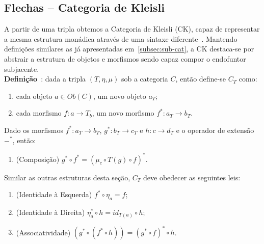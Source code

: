 \documentclass[10pt, conference]{IEEEtran}
\begin{document}
\subsection{Flechas -- Categoria de Kleisli}
\label{subsec:arrow}
A partir de uma tripla obtemos a Categoria de Kleisli (CK), capaz de representar a mesma estrutura monádica através de uma sintaxe diferente~\cite{hill1994introduction}. Mantendo definições similares as já apresentadas em~\ref{subsec:sub-cat}, a CK destaca-se por abstrair a estrutura de objetos e morfismos sendo capaz compor o endofuntor subjacente.\\

\textbf{Definição}~\cite{maclane1971mat, pedicchio2004categorical, hill1994introduction}: dada a tripla $(T, \eta, \mu)$ sob a categoria $C$, então define-se $C_T$ como:

\begin{enumerate}[label=(\alph*), leftmargin=3em, topsep = 0pt, itemsep = 1ex, partopsep = 1ex, parsep = 1ex]
	\item cada objeto $a \in Ob(C)$, um novo objeto $a_T$;
	\item cada morfismo $f: a \rightarrow T_b$, um novo morfismo ${f^*: a_T \rightarrow b_T}$.
\end{enumerate}

\bigskip

Dado os morfismos ${f^*: a_T \rightarrow b_T}$, $g^*: b_T \rightarrow c_T$ e ${h: c \rightarrow d_T}$ e o operador de extensão $-^*$, então:

\begin{enumerate}[label={}, leftmargin = 2em, topsep = 0pt, itemsep = 1ex,partopsep = 1ex, parsep = 1ex]
	\item (Composição) $g^* \circ f^* = (\mu_c \circ T(g) \circ f)^*$.
\end{enumerate}

\bigskip

Similar as outras estruturas desta seção, $C_T$ deve obedecer as seguintes leis:

\begin{enumerate}[label={}, leftmargin = 2em, topsep = 0pt, itemsep = 1ex,partopsep = 1ex, parsep = 1ex]
	\item (Identidade à Esquerda) $f^* \circ \eta_a = f$;
	\item (Identidade à Direita) $\eta^*_a \circ h = id_{T(a)} \circ h$;
	\item (Associatividade) $(g^* \circ (f^* \circ h)) = (g^* \circ f)^* \circ h$.
\end{enumerate}
\end{document}
